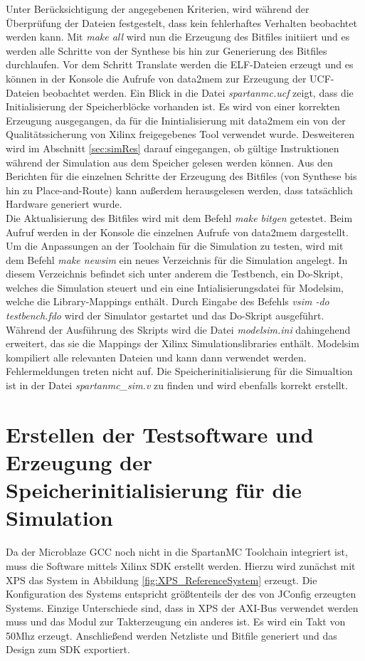Unter Berücksichtigung der angegebenen Kriterien, wird während der Überprüfung der Dateien festgestelt, dass kein fehlerhaftes Verhalten beobachtet werden kann. Mit \textit{make all} wird nun die Erzeugung des Bitfiles initiiert und es werden alle Schritte von der Synthese bis hin zur Generierung des Bitfiles durchlaufen. Vor dem Schritt Translate werden die ELF-Dateien erzeugt und es können in der Konsole die Aufrufe von data2mem zur Erzeugung der UCF-Dateien beobachtet werden. Ein Blick in die Datei \textit{spartanmc.ucf} zeigt, dass die Initialisierung der Speicherblöcke vorhanden ist. Es wird von einer korrekten Erzeugung ausgegangen, da für die Inintialisierung mit data2mem ein von der Qualitätssicherung von Xilinx freigegebenes Tool verwendet wurde. Desweiteren wird im Abschnitt \ref{sec:simRes} darauf eingegangen, ob gültige Instruktionen während der Simulation aus dem Speicher gelesen werden können. Aus den Berichten für die einzelnen Schritte der Erzeugung des Bitfiles (von Synthese bis hin zu Place-and-Route) kann außerdem herausgelesen werden, dass tatsächlich Hardware generiert wurde.\\
Die Aktualisierung des Bitfiles wird mit dem Befehl \textit{make bitgen} getestet. Beim Aufruf werden in der Konsole die einzelnen Aufrufe von data2mem dargestellt.\\
Um die Anpassungen an der Toolchain für die Simulation zu testen, wird mit dem Befehl \textit{make newsim} ein neues Verzeichnis für die Simulation angelegt. In diesem Verzeichnis befindet sich unter anderem die Testbench, ein Do-Skript, welches die Simulation steuert und ein eine Intialisierungsdatei für Modelsim, welche die Library-Mappings enthält. Durch Eingabe des Befehls \textit{vsim -do testbench.fdo} wird der Simulator gestartet und das Do-Skript ausgeführt. Während der Ausführung des Skripts wird die Datei \textit{modelsim.ini} dahingehend erweitert, das sie die Mappings der Xilinx Simulationslibraries enthält. Modelsim kompiliert alle relevanten Dateien und kann dann verwendet werden. Fehlermeldungen treten nicht auf. Die Speicherinitialisierung für die Simualtion ist in der Datei \textit{spartanmc\_sim.v} zu finden und wird ebenfalls korrekt erstellt.
\section{Erstellen der Testsoftware und Erzeugung der Speicherinitialisierung für die Simulation}
Da der Microblaze GCC noch nicht in die SpartanMC Toolchain integriert ist, muss die Software mittels Xilinx SDK erstellt werden. Hierzu wird zunächst mit XPS das System in Abbildung \ref{fig:XPS_ReferenceSystem} erzeugt. Die Konfiguration des Systems entspricht größtenteils der des von JConfig erzeugten Systems. Einzige Unterschiede sind, dass in XPS der AXI-Bus verwendet werden muss und das Modul zur Takterzeugung ein anderes ist. Es wird ein Takt von 50Mhz erzeugt. Anschließend werden Netzliste und Bitfile generiert und das Design zum SDK exportiert.

